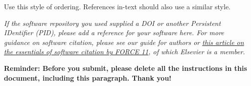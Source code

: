 \documentclass[preprint,12pt, a4paper]{elsarticle}
\begin{document}
 

\begin{thebibliography}{00}


\bibitem{} Use this style of ordering. References in-text should also use a similar style.

\end{thebibliography}

\textit{If the software repository you used supplied a DOI or another
Persistent IDentifier (PID), please add a reference for your software
here. For more guidance on software citation, please see our guide for
authors or \href{https://f1000research.com/articles/9-1257/v2}{this
  article on the essentials of software citation by FORCE 11}, of
which Elsevier is a member.}

\large{\textbf{Reminder: Before you submit, please delete all 
the instructions in this document, 
including this paragraph. 
Thank you!}}
\end{document}
